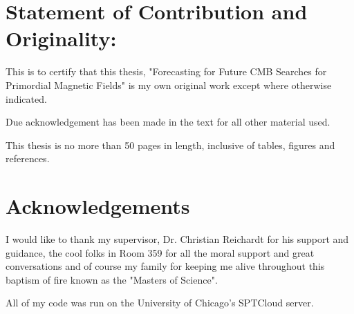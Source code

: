 \section*{Statement of Contribution and Originality:}

This is to certify that this thesis, "Forecasting for Future CMB Searches for Primordial Magnetic Fields" is my own original work except where otherwise indicated.

Due acknowledgement has been made in the text for all other material used.

This thesis is no more than 50 pages in length, inclusive of tables, figures and references.

\section*{Acknowledgements}

I would like to thank my supervisor, Dr. Christian Reichardt for his support and guidance, the cool folks in Room 359 for all the moral support and great conversations and of course my family for keeping me alive throughout this baptism of fire known as the "Masters of Science".

All of my code was run on the University of Chicago's SPTCloud server.